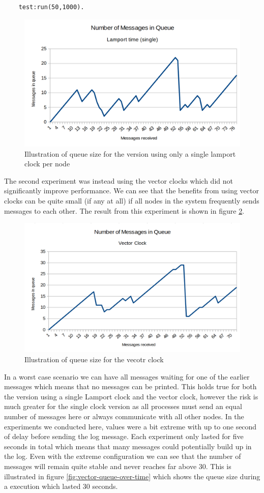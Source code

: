 \begin{lstlisting}
	test:run(50,1000).
\end{lstlisting}

\begin{figure}[h]
\centering
\includegraphics[width=0.8\linewidth]{res/lamport-queue}
\caption{Illustration of queue size for the version using only a single lamport clock per node}
\label{fig:lamport-queue}
\end{figure}

The second experiment was instead using the vector clocks which did not significantly improve performance. We can see that the benefits from using vector clocks can be quite small (if any at all) if all nodes in the system frequently sends messages to each other. The result from this experiment is shown in figure \ref{fig:vector-queue}.

\begin{figure}[h]
\centering
\includegraphics[width=0.8\linewidth]{res/vector-queue}
\caption{Illustration of queue size for the vecotr clock}
\label{fig:vector-queue}
\end{figure}

In a worst case scenario we can have all messages waiting for one of the earlier messages which means that no messages can be printed. This holds true for both the version using a single Lamport clock and the vector clock, however the risk is much greater for the single clock version as all processes must send an equal number of messages here or always communicate with all other nodes. In the experiments we conducted here, values were a bit extreme with up to one second of delay before sending the log message. Each experiment only lasted for five seconds in total which means that many messages could potentially build up in the log. Even with the extreme configuration we can see that the number of messages will remain quite stable and never reaches far above 30. This is illustrated in figure \ref{fig:vector-queue-over-time} which shows the queue size during a execution which lasted 30 seconds.

